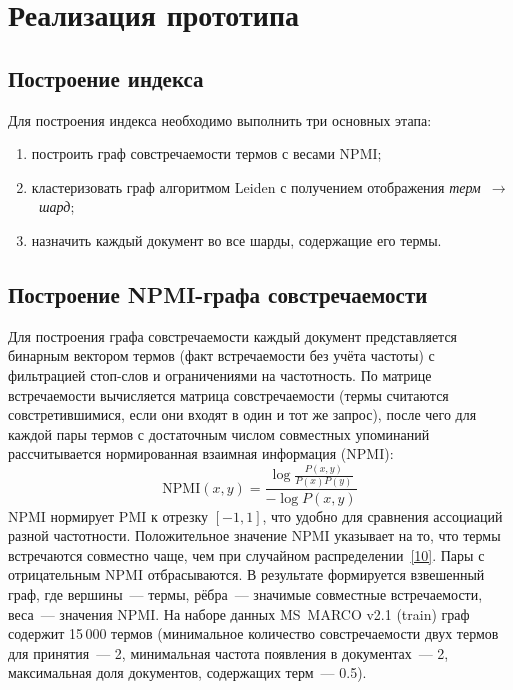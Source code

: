 \documentclass[14pt, a4paper]{article}
\newcommand{\srcref}[1]{\hyperlink{src:i#1}{[#1]}}
\begin{document}
	\section{Реализация прототипа}

	\subsection{Построение индекса}

	Для построения индекса необходимо выполнить три основных этапа:
	\begin{enumerate}
		\item построить граф совстречаемости термов с весами NPMI;
		\item кластеризовать граф алгоритмом Leiden с получением отображения \textit{терм~$\to$~шард};
		\item назначить каждый документ во все шарды, содержащие его термы.
	\end{enumerate}

	\subsection{Построение NPMI-графа совстречаемости}

	Для построения графа совстречаемости каждый документ представляется бинарным вектором термов (факт встречаемости без учёта частоты) с фильтрацией стоп-слов и ограничениями на частотность.
	По матрице встречаемости вычисляется матрица совстречаемости (термы считаются совстретившимися, если они входят в один и тот же запрос), после чего для каждой пары термов с достаточным числом совместных упоминаний рассчитывается нормированная взаимная информация (NPMI):
	\begin{equation}
		\mathrm{NPMI}(x,y) = \frac{\log\frac{P(x,y)}{P(x)P(y)}}{-\log P(x,y)}
	\end{equation}
	NPMI нормирует PMI к отрезку $[-1, 1]$, что удобно для сравнения ассоциаций разной частотности.
	Положительное значение NPMI указывает на то, что термы встречаются совместно чаще, чем при случайном распределении~\srcref{10}.
	Пары с отрицательным NPMI отбрасываются.
	В результате формируется взвешенный граф, где вершины~--- термы, рёбра~--- значимые совместные встречаемости, веса~--- значения NPMI.
	На наборе данных MS~MARCO v2.1 (train) граф содержит 15\,000 термов (минимальное количество совстречаемости двух термов для принятия~--- 2, минимальная частота появления в документах~--- 2, максимальная доля документов, содержащих терм~--- 0.5).
\end{document}
